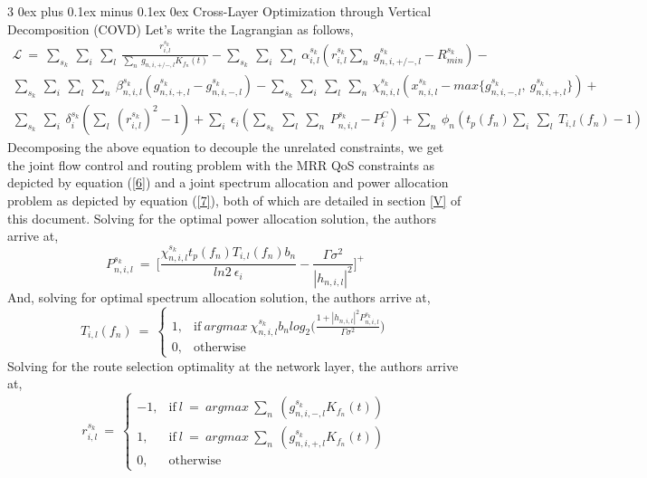 \documentclass[12pt, draftcls, onecolumn]{IEEEtran}
\makeatletter
\def\subsubsection{\@startsection{subsubsection}%
                                 {3}%
                                 {\z@}%
                                 {0ex plus 0.1ex minus 0.1ex}%
                                 {0ex}%
                                 {\normalfont\normalsize\bfseries}}%
\makeatother
\begin{document}
\subsubsection{Cross-Layer Optimization through Vertical Decomposition (COVD)}
Let's write the Lagrangian as follows,
\begin{equation}
    \begin{aligned}
        \mathcal{L}\ =\ \sum_{s_k}\ \sum_{i}\ \sum_{l}\ \frac{r_{i,l}^{s_k}}{\sum_{n}\ g_{n,i,+/-,l} K_{f_n}(t)} - \sum_{s_k}\ \sum_{i}\ \sum_{l}\ \alpha_{i,l}^{s_k}(r_{i,l}^{s_k}\sum_n\ g_{n,i,+/-,l}^{s_k} - R_{min}^{s_k}) - \\\sum_{s_k}\ \sum_{i}\ \sum_{l}\ \sum_{n}\ \beta_{n,i,l}^{s_k}(g_{n,i,+,l}^{s_k} - g_{n,i,-,l}^{s_k}) - \sum_{s_k}\ \sum_{i}\ \sum_{l}\ \sum_n\ \chi_{n,i,l}^{s_k}(x_{n,i,l}^{s_k} - max\{g_{n,i,-,l}^{s_k},\ g_{n,i,+,l}^{s_k}\}) + \\\sum_{s_k}\ \sum_{i}\ \delta_i^{s_k}(\sum_l\ (r_{i,l}^{s_k})^2 - 1) + \sum_i\ \epsilon_i(\sum_{s_k}\ \sum_l\ \sum_n\ P_{n,i,l}^{s_k} - P_i^C) + \sum_n\ \phi_n(t_p(f_n) \sum_i\ \sum_l\ T_{i,l}(f_n) - 1)
    \end{aligned}
\end{equation}
Decomposing the above equation to decouple the unrelated constraints, we get the joint flow control and routing problem with the MRR QoS constraints as depicted by equation (\ref{6}) and a joint spectrum allocation and power allocation problem as depicted by equation (\ref{7}), both of which are detailed in section \ref{V} of this document.
Solving for the  optimal power allocation solution, the authors arrive at,
\[P_{n,i,l}^{s_k}\ =\ \Big[\frac{\chi_{n,i,l}^{s_k} t_p(f_n) T_{i,l}(f_n) b_n}{ln2\ \epsilon_i} - \frac{\Gamma \sigma^2}{|h_{n,i,l}|^2}\Big]^+\]
And, solving for optimal spectrum allocation solution, the authors arrive at,
\begin{equation*}
    T_{i,l}(f_n)\ =\ 
    \begin{cases}
        1, & \text{if}\ argmax\ \chi_{n,i,l}^{s_k} b_n log_2\Big(\frac{1+|h_{n,i,l}|^2 P_{n,i,l}^{s_k}}{\Gamma \sigma^2}\Big)\\
        0, & \text{otherwise}
    \end{cases}
\end{equation*}
Solving for the route selection optimality at the network layer, the authors arrive at,
\begin{equation*}
    r_{i,l}^{s_k}\ =\ 
    \begin{cases}
        -1, & \text{if}\ l\ =\ argmax\ \sum_n\ (g_{n,i,-,l}^{s_k} K_{f_n}(t))\\
        1, & \text{if}\ l\ =\ argmax\ \sum_n\ (g_{n,i,+,l}^{s_k} K_{f_n}(t))\\
        0, & \text{otherwise}
    \end{cases}
\end{equation*}
\end{document}
